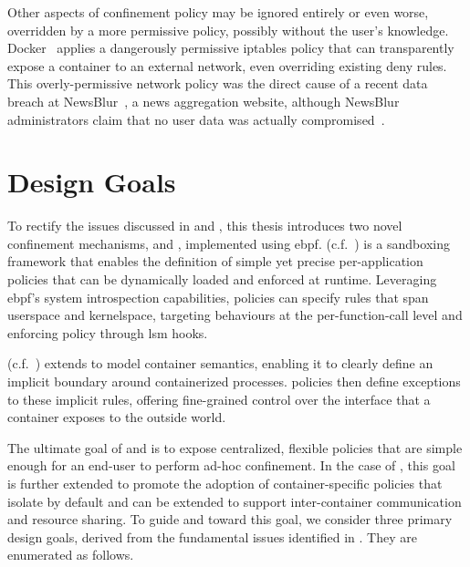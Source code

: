 Other aspects of confinement policy may be ignored entirely or even worse, overridden by
a more permissive policy, possibly without the user's knowledge.
Docker~\cite{docker_security} applies a dangerously permissive iptables policy that can
transparently expose a container to an external network, even overriding existing deny
rules. This overly-permissive network policy was the direct cause of a recent data breach
at NewsBlur~\cite{newsblur}, a news aggregation website, although NewsBlur administrators
claim that no user data was actually compromised~\cite{newsblur}. %



\section{Design Goals}%
\label{s:cp-design}


To rectify the issues discussed in  and , this
thesis introduces two novel confinement mechanisms, \bpfbox{} and \bpfcontain{},
implemented using \gls{ebpf}. \bpfbox{} (c.f.~) is a sandboxing framework
that enables the definition of simple yet precise per-application policies that can be
dynamically loaded and enforced at runtime. Leveraging \gls{ebpf}'s system
introspection capabilities, \bpfbox{} policies can specify rules that span userspace and
kernelspace, targeting behaviours at the per-function-call level and enforcing policy
through \gls{lsm} hooks.

\bpfcontain{} (c.f.~) extends \bpfbox{} to model container semantics,
enabling it to clearly define an implicit boundary around containerized processes.
\bpfcontain{} policies then define exceptions to these implicit rules, offering
fine-grained control over the interface that a container exposes to the outside world.

The ultimate goal of \bpfbox{} and \bpfcontain{} is to expose centralized, flexible
policies that are simple enough for an end-user to perform ad-hoc confinement. In the case
of \bpfcontain{}, this goal is further extended to promote the adoption of
container-specific policies that isolate by default and can be extended to support
inter-container communication and resource sharing. To guide \bpfbox{} and \bpfcontain{}
toward this goal, we consider three primary design goals, derived from the fundamental
issues identified in . They are enumerated as follows.

